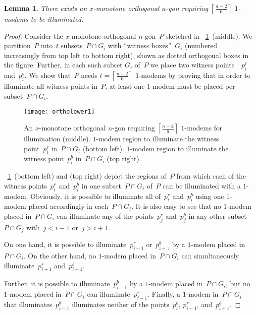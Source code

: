 \documentclass[A4]{article}
\newtheorem{lemma}[theorem]{Lemma}
\begin{document}
\begin{lemma}\label{lem:ortholower1}
  There exists an $x$-monotone orthogonal $n$-gon requiring $\left\lceil \frac{n-2}{6} \right\rceil$ \mbox{$1$-modems} to be illuminated.  
\end{lemma}
\begin{proof}
  Consider the $x$-monotone orthogonal $n$-gon~$P$ sketched in \figurename~\ref{fig:ortholower1}~(middle).
  We partition~$P$ into~$t$ subsets~\mbox{$P\cap G_i$} with ``witness boxes''~$G_i$ (numbered increasingly from top left to bottom right), shown as dotted orthogonal boxes in the figure.
  Further, in each such subset $G_i$ of~$P$ we place two witness points~~$p^r_i$ and~$p^b_i$. 
  We show that~$P$ needs $t= \left\lceil \frac{n-2}{6} \right\rceil$ \mbox{$1$-modems} by proving that in order to illuminate all witness points in~$P$, at least one \mbox{$1$-modem} must be placed per subset~$P\cap G_i$.


\begin{figure}[htb]
  \centering
  \texttt{[image: ortholower1]}
  \caption{An $x$-monotone orthogonal $n$-gon requiring $\left\lceil \frac{n-2}{6} \right\rceil$ \mbox{$1$-modems} for illumination (middle).
	  \mbox{$1$-modem} region to illuminate the witness point~$p^r_i$ in~$P\cap G_i$ (bottom left).
	  \mbox{$1$-modem} region to illuminate the witness point~$p^b_i$ in~$P\cap G_i$ (top right).
}
 \label{fig:ortholower1}
\end{figure}


\figurename~\ref{fig:ortholower1}~(bottom left) and (top right) depict the regions of~$P$ from which each of the witness points~$p^r_i$ and~$p^b_i$ in one subset~$P\cap G_i$ of~$P$ can be illuminated with a \mbox{$1$-modem}. 
Obviously, it is possible to illuminate all of~$p^r_i$ and~$p^b_i$ using one \mbox{$1$-modem} placed accordingly in each~$P\cap G_i$.
It is also easy to see that no \mbox{$1$-modem} placed in~$P\cap G_i$ can illuminate any of the points~$p^r_j$ and~$p^b_j$ in any other subset~$P\cap G_j$ with~$j < i-1$ or~$j > i+1$.

On one hand, it is possible to illuminate~$p^r_{i+1}$ or~$p^b_{i+1}$ by a \mbox{$1$-modem} placed in~$P\cap G_i$.
On the other hand, no \mbox{$1$-modem} placed in~$P\cap G_i$ can simultaneously illuminate~$p^r_{i+1}$ and~$p^b_{i+1}$.
	
Further, it is possible to illuminate~$p^b_{i-1}$ by a \mbox{$1$-modem} placed in~$P\cap G_i$, but no \mbox{$1$-modem} placed in~$P\cap G_i$ can illuminate~$p^r_{i-1}$.
Finally, a \mbox{$1$-modem} in~$P\cap G_i$ that illuminates~$p^b_{i-1}$ illuminates neither of the points~$p^b_i$, $p^r_{i+1}$, and~$p^b_{i+1}$.




\end{proof}
\end{document}
